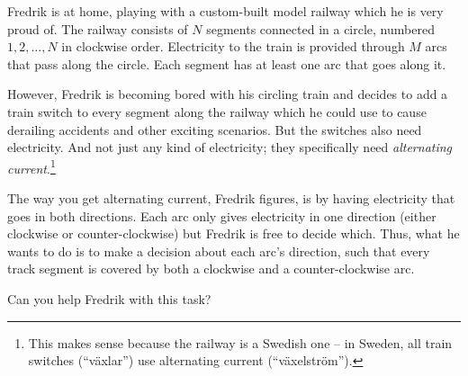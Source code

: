 \ifx\boi\undefined\fi
\def\version{jury-1}
Fredrik is at home, playing with a custom-built model railway which he is very proud of.
The railway consists of $N$ segments connected in a circle, numbered $1, 2, \dots, N$ in clockwise order.
Electricity to the train is provided through $M$ arcs that pass along the
circle. Each segment has at least one arc that goes along it.

However, Fredrik is becoming bored with his circling train and decides to add a train switch to every segment along the railway which he could use to cause derailing accidents and other exciting scenarios. But the switches also need electricity.
And not just any kind of electricity; they specifically need \emph{alternating current}.\footnote{This makes sense because the railway is a Swedish one -- in Sweden, all train switches (``växlar'') use alternating current (``växelström'').}




The way you get alternating current, Fredrik figures, is by having electricity
that goes in both directions. Each arc only gives electricity in one direction
(either clockwise or counter-clockwise) but Fredrik is free to decide which.
Thus, what he wants to do is to make a decision about each arc's direction,
such that every track segment is covered by both a clockwise and a
counter-clockwise arc.

Can you help Fredrik with this task?

